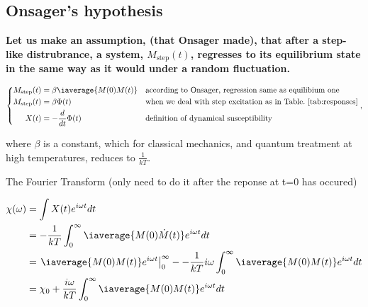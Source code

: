 \newpage \subsection{Onsager's hypothesis}
\begin{framed}\noindent
  \textbf{Let us make an assumption, (that  Onsager made), that after a step-like
    distrubrance, a  system, $ M_\text{step}(t)  $, regresses to  its equilibrium
    state in the same way as it would under a random fluctuation.
  }
\end{framed}
\begin{equation}
  \left\lbrace\begin{aligned}
      M_\text{step}(t) & = \beta\iaverage{M(0)M(t)} && \text{according to Onsager, regression same as equilibium one}\\
      M_\text{step}(t) & = \beta\Phi(t) && \text{when we deal with step excitation as in Table.~\ref{tab:responses}}\\
      X(t) & = -\frac{d}{dt}\Phi(t) && \text{definition of dynamical susceptibility}
    \end{aligned}\right.,
\end{equation}

\noindent  where $  \beta $  is a  constant, which  for classical  mechanics, and
quantum treatment at high temperatures, reduces to $ \frac{1}{kT} $.

The Fourier Transform (only need to do it after the reponse at t=0 has occured)

\begin{equation}\label{eqn:susceptibility_from_response_0}
  \begin{aligned}
    \chi(\omega) & = \int X(t)e^{i\omega t} dt\\
    & = -\frac{1}{kT}\int_0^\infty\iaverage{M(0)\dot{M}(t)}e^{i\omega t}dt\\
    & = \left.\iaverage{M(0)M(t)}e^{i\omega t} \right|_0^\infty - - \frac{1}{kT}i\omega\int_{0}^\infty\iaverage{M(0)M(t)}e^{i\omega t}dt\\
    & = \chi_0 + \frac{i\omega}{kT}\int_{0}^\infty\iaverage{M(0)M(t)}e^{i\omega t}dt\\
  \end{aligned}
\end{equation}


